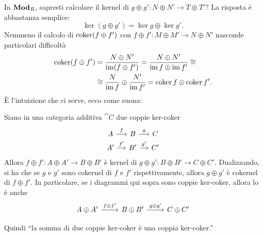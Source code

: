 In \(\mathbf{Mod}_R\), sapresti calcolare il kernel di
\(g \oplus g' : N \oplus N' \to T \oplus T'\)? La risposta è abbastanza
semplice:
\[
  \ker (g \oplus g') = \ker g \oplus \ker g' .
\]
Nemmeno il calcolo di \(\operatorname{coker}(f \oplus f')\) con
\(f \oplus f' : M \oplus M' \to N \oplus N'\) nasconde particolari
difficoltà
\begin{align*}
  \operatorname{coker} (f \oplus f') &= \frac{N \oplus N'}{\operatorname{im} (f \oplus f')} = \frac{N \oplus N'}{\operatorname{im} f \oplus
                         \operatorname{im} f'} \cong \\
                       &\cong\frac{N}{\operatorname{im} f} \oplus \frac{N'}{\operatorname{im} f'} = \operatorname{coker} f \oplus \operatorname{coker} f' . 
\end{align*}
È l'intuizione che ci serve, ecco come suona:

\begin{lemma}\label{lemma:KerCokerOplus}
  Siano in una categoria additiva \(\cat C\) due coppie ker-coker
  \[
    \begin{tikzcd}[row sep=tiny, column sep=small]
      A \ar["{f}", r] & B \ar["{g}", r] & C \\
      A' \ar["{f'}", r] & B' \ar["{g'}", r] & C'
    \end{tikzcd}
  \]
  Allora \(f \oplus f' : A \oplus A' \to B \oplus B'\) è kernel di
  \(g \oplus g' : B \oplus B' \to C \oplus C'\). Dualizzando, si ha che
  se \(g\) e \(g'\) sono cokernel di \(f\) e \(f'\) rispettivamente,
  allora \(g \oplus g'\) è cokernel di \(f \oplus f'\). In particolare,
  se i diagrammi qui sopra sono coppie ker-coker, allora lo è anche
  \[
    \begin{tikzcd}
      A \oplus A' \ar["{f \oplus f'}", r] & B \oplus B' \ar["{g \oplus
        g'}", r] & C \oplus C'
    \end{tikzcd}
  \]
\end{lemma}

Quindi ``la somma di due coppie ker-coker è una coppia ker-coker.''

